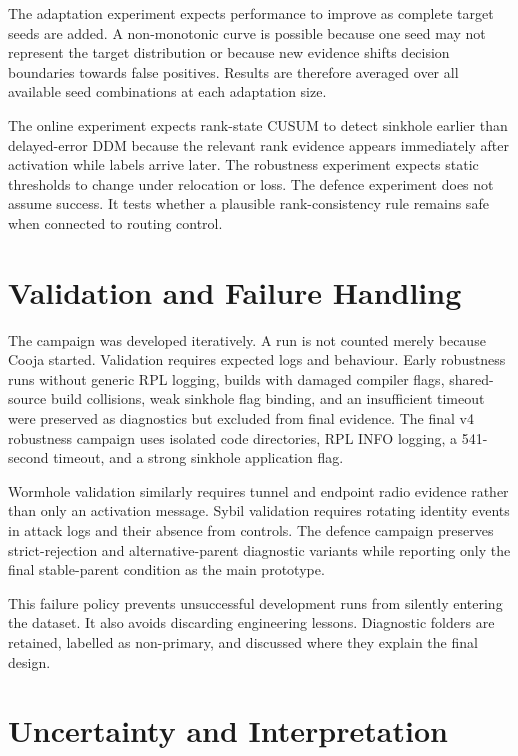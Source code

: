 The adaptation experiment expects performance to improve as complete target seeds are added. A non-monotonic curve is possible because one seed may not represent the target distribution or because new evidence shifts decision boundaries towards false positives. Results are therefore averaged over all available seed combinations at each adaptation size.

The online experiment expects rank-state CUSUM to detect sinkhole earlier than delayed-error DDM because the relevant rank evidence appears immediately after activation while labels arrive later. The robustness experiment expects static thresholds to change under relocation or loss. The defence experiment does not assume success. It tests whether a plausible rank-consistency rule remains safe when connected to routing control.

\section{Validation and Failure Handling}

The campaign was developed iteratively. A run is not counted merely because Cooja started. Validation requires expected logs and behaviour. Early robustness runs without generic RPL logging, builds with damaged compiler flags, shared-source build collisions, weak sinkhole flag binding, and an insufficient timeout were preserved as diagnostics but excluded from final evidence. The final v4 robustness campaign uses isolated code directories, RPL INFO logging, a 541-second timeout, and a strong sinkhole application flag.

Wormhole validation similarly requires tunnel and endpoint radio evidence rather than only an activation message. Sybil validation requires rotating identity events in attack logs and their absence from controls. The defence campaign preserves strict-rejection and alternative-parent diagnostic variants while reporting only the final stable-parent condition as the main prototype.

This failure policy prevents unsuccessful development runs from silently entering the dataset. It also avoids discarding engineering lessons. Diagnostic folders are retained, labelled as non-primary, and discussed where they explain the final design.

\section{Uncertainty and Interpretation}

